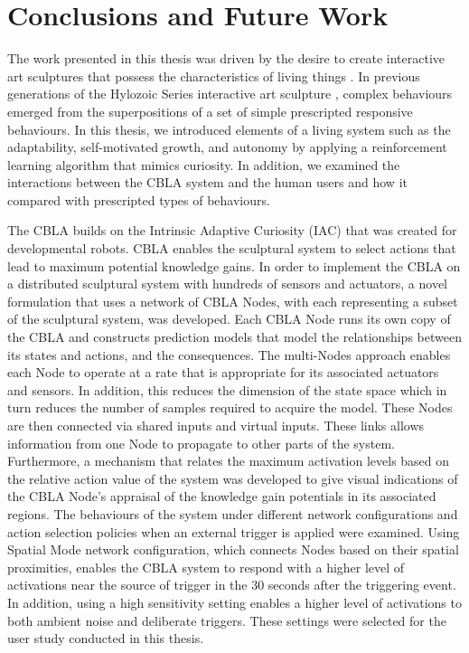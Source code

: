 \chapter{Conclusions and Future Work} \label{chap:conclusions}
 
The work presented in this thesis was driven by the desire to create interactive art sculptures that possess the characteristics of living things \cite{Gorbet2015}. In previous generations of the Hylozoic Series interactive art sculpture \cite{Beesley2012}, complex behaviours emerged from the superpositions of a set of simple prescripted responsive behaviours. In this thesis, we introduced elements of a living system such as the adaptability, self-motivated growth, and autonomy by applying a reinforcement learning algorithm that mimics curiosity. In addition, we examined the interactions between the CBLA system and the human users and how it compared with prescripted types of behaviours.
 
The CBLA builds on the Intrinsic Adaptive Curiosity (IAC) \cite{Oudeyer2007} that was created for developmental robots. CBLA enables the sculptural system to select actions that lead to maximum potential knowledge gains. In order to implement the CBLA on a distributed sculptural system with hundreds of sensors and actuators, a novel formulation that uses a network of CBLA Nodes, with each representing a subset of the sculptural system, was developed. Each CBLA Node runs its own copy of the CBLA and constructs prediction models that model the relationships between its states and actions, and the consequences. The multi-Nodes approach enables each Node to operate at a rate that is appropriate for its associated actuators and sensors. In addition, this reduces the dimension of the state space which in turn reduces the number of samples required to acquire the model. These Nodes are then connected via shared inputs and virtual inputs. These links allows information from one Node to propagate to other parts of the system. Furthermore, a mechanism that relates the maximum activation levels based on the relative action value of the system was developed to give visual indications of the CBLA Node's appraisal of the knowledge gain potentials in its associated regions. The behaviours of the system under different network configurations and action selection policies when an external trigger is applied were examined. Using Spatial Mode network configuration, which connects Nodes based on their spatial proximities, enables the CBLA system to respond with a higher level of activations near the source of trigger in the 30 seconds after the triggering event. In addition, using a high sensitivity setting enables a higher level of activations to both ambient noise and deliberate triggers. These settings were selected for the user study conducted in this thesis.

